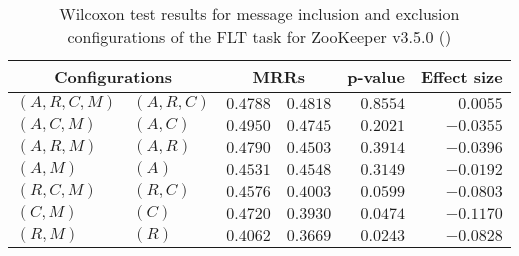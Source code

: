 
\begin{table}
\begin{spacing}{1.2}
\centering
\caption{Wilcoxon test results for message inclusion and exclusion configurations of the FLT task for ZooKeeper v3.5.0 (\ctwo)}
\label{table:versus-wilcox-zookeeper-flt-message}
\begin{tabular}{ll|rr|rr}
\toprule
      \multicolumn{2}{c|}{Configurations} &                \multicolumn{2}{c|}{MRRs} &             p-value & Effect size \\
\midrule
 $(A,R,C,M)$ &  $(A,R,C)$ &       $0.4788$ &  $\bm{0.4818}$ & $0.8554$ &    $0.0055$ \\
   $(A,C,M)$ &    $(A,C)$ &  $\bm{0.4950}$ &       $0.4745$ & $0.2021$ &   $-0.0355$ \\
   $(A,R,M)$ &    $(A,R)$ &  $\bm{0.4790}$ &       $0.4503$ & $0.3914$ &   $-0.0396$ \\
     $(A,M)$ &      $(A)$ &       $0.4531$ &  $\bm{0.4548}$ & $0.3149$ &   $-0.0192$ \\
   $(R,C,M)$ &    $(R,C)$ &  $\bm{0.4576}$ &       $0.4003$ & $0.0599$ &   $-0.0803$ \\
     $(C,M)$ &      $(C)$ &  $\bm{0.4720}$ &       $0.3930$ & $0.0474$ &   $-0.1170$ \\
     $(R,M)$ &      $(R)$ &  $\bm{0.4062}$ &       $0.3669$ & $0.0243$ &   $-0.0828$ \\
\bottomrule
\end{tabular}

\end{spacing}
\end{table}

